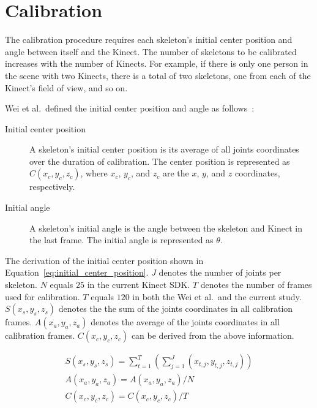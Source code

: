\section{Calibration}
\label{sec:current_approach_calibration}

The calibration procedure requires each skeleton's initial center position and angle between itself and the Kinect. The number of skeletons to be calibrated increases with the number of Kinects. For example, if there is only one person in the scene with two Kinects, there is a total of two skeletons, one from each of the Kinect's field of view, and so on.

Wei et al.\ defined the initial center position and angle as follows~\cite{wei_kinect_calibration}:

\begin{description}
  \item[Initial center position] A skeleton's initial center position is its average of all joints coordinates over the duration of calibration. The center position is represented as $C(x_c, y_c, z_c)$, where $x_c$, $y_c$, and $z_c$ are the $x$, $y$, and $z$ coordinates, respectively.
  \item[Initial angle] A skeleton's initial angle is the angle between the skeleton and Kinect in the last frame. The initial angle is represented as $\theta$.
\end{description}

The derivation of the initial center position shown in Equation~\ref{eq:initial_center_position}. $J$ denotes the number of joints per skeleton. $N$ equals $25$ in the current Kinect SDK. $T$ denotes the number of frames used for calibration. $T$ equals $120$ in both the Wei et al.\ and the current study. $S(x_s, y_s, z_s)$ denotes the the sum of the joints coordinates in all calibration frames. $A(x_a, y_a, z_a)$ denotes the average of the joints coordinates in all calibration frames. $C(x_c, y_c, z_c)$ can be derived from the above information.

\begin{equation}[!h]
\label{eq:initial_center_position}
\begin{gathered}
S(x_s, y_s, z_s) = \sum_{t=1}^T (\sum_{j=1}^J (x_{t,j}, y_{t,j}, z_{t,j})) \\
A(x_a, y_a, z_a) = A(x_a, y_a, z_a) / N \\
C(x_c, y_c, z_c) = C(x_c, y_c, z_c) / T
\end{gathered}
\end{equation}

